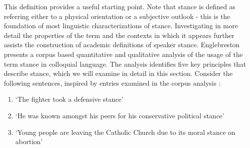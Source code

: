 \documentclass[Dissertation.tex]{subfiles}
\begin{document}
This definition provides a useful starting point. Note that stance is defined as referring either to a physical orientation or a subjective outlook - this is the foundation of most linguistic characterizations of stance. Investigating in more detail the properties of the term and the contexts in which it appears further assists the construction of academic definitions of speaker stance. Englebreston \cite{englebretsonStancetakingDiscourseSubjectivity2007} presents a corpus based quantitative and qualitative analysis of the usage of the term stance in colloquial language. The analysis identifies five key principles that describe stance, which we will examine in detail in this section. Consider the following sentences, inspired by entries examined in the corpus analysis \cite{englebretsonStancetakingDiscourseSubjectivity2007}:


\begin{enumerate}
	\renewcommand{\labelenumi}{(\Alph{enumi})}
	\item `The fighter took a defensive stance'
	\item `He was known amongst his peers for his conservative political stance'
	\item `Young people are leaving the Catholic Church due to its moral stance on abortion'
	\
\end{enumerate}
\end{document}
